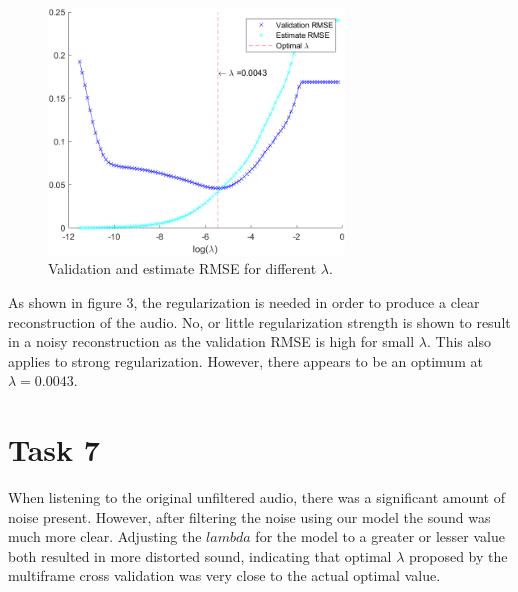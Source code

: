 \documentclass{article}
\begin{document}
\begin{figure}[h]
    \centering
    \includegraphics[width=0.7\textwidth]{task61.png}
    \caption{Validation and estimate RMSE for different $\lambda$.}
    \label{fig:my_label}
\end{figure}

As shown in figure 3, the regularization is needed in order to produce a clear reconstruction of the audio. No, or little regularization strength is shown to result in a noisy reconstruction as the validation RMSE is high for small $\lambda$. This also applies to strong regularization. However, there appears to be an optimum at $\lambda = 0.0043$.


\section{Task 7}
When listening to the original unfiltered audio, there was a significant amount of noise present. However, after filtering the noise using our model the sound was much more clear. Adjusting the $lambda$ for the model to a greater or lesser value both resulted in more distorted sound, indicating that optimal $\lambda$ proposed by the multiframe cross validation was very close to the actual optimal value.
\end{document}
